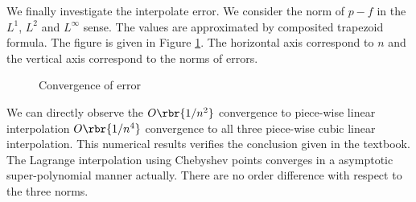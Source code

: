 \documentclass[english, nochinese]{pnote}
\begin{document}
We finally investigate the interpolate error. We consider the norm of $ p - f $ in the $L^1$, $L^2$ and $L^{\infty}$ sense. The values are approximated by composited trapezoid formula. The figure is given in Figure \ref{Fig:Err}. The horizontal axis correspond to $n$ and the vertical axis correspond to the norms of errors.

\begin{figure}
\centering
\scalebox{0.7}{}
\caption{Convergence of error}
\label{Fig:Err}
\end{figure}

We can directly observe the $ O \rbr{ 1 / n^2 } $ convergence to piece-wise linear interpolation $ O \rbr{ 1 / n^4 } $ convergence to all three piece-wise cubic linear interpolation. This numerical results verifies the conclusion given in the textbook. The Lagrange interpolation using Chebyshev points converges in a asymptotic super-polynomial manner actually. There are no order difference with respect to the three norms.
\end{document}
